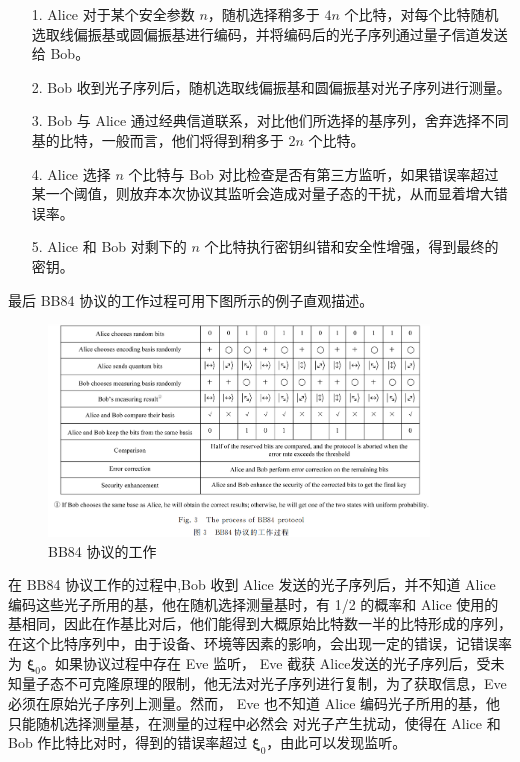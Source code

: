 \begin{itemize}
\item [1.] Alice 对于某个安全参数 $n$，随机选择稍多于 $4n$ 个比特，对每个比特随机选取线偏振基或圆偏振基进行编码，并将编码后的光子序列通过量子信道发送给 Bob。
\item [2.] Bob 收到光子序列后，随机选取线偏振基和圆偏振基对光子序列进行测量。
\item [3.] Bob 与 Alice 通过经典信道联系，对比他们所选择的基序列，舍弃选择不同基的比特，一般而言，他们将得到稍多于 $2n$ 个比特。
\item [4.] Alice 选择 $n$ 个比特与 Bob 对比检查是否有第三方监听，如果错误率超过某一个阈值，则放弃本次协议其监听会造成对量子态的干扰，从而显着增大错误率。
\item [5.] Alice 和 Bob 对剩下的 $n$ 个比特执行密钥纠错和安全性增强，得到最终的密钥。
\end{itemize}

最后 BB84 协议的工作过程可用下图所示的例子直观描述。

\begin{figure}[htb]
\centering 
\includegraphics[width=0.90\textwidth]{img/ch2m3.png} 
\caption{BB84 协议的工作}
\label{Test}
\end{figure}
在 BB84 协议工作的过程中,Bob 收到 Alice 发送的光子序列后，并不知道 Alice 编码这些光子所用的基，他在随机选择测量基时，有 1/2 的概率和 Alice 使用的基相同，因此在作基比对后，他们能得到大概原始比特数一半的比特形成的序列，在这个比特序列中，由于设备、环境等因素的影响，会出现一定的错误，记错误率为 $\boldsymbol{\xi}_{0}$。如果协议过程中存在 Eve 监听， Eve 截获 Alice发送的光子序列后，受未知量子态不可克隆原理的限制，他无法对光子序列进行复制，为了获取信息，Eve 必须在原始光子序列上测量。然而， Eve 也不知道 Alice 编码光子所用的基，他只能随机选择测量基，在测量的过程中必然会
对光子产生扰动，使得在 Alice 和 Bob 作比特比对时，得到的错误率超过 $\boldsymbol{\xi}_{0}$，由此可以发现监听。

